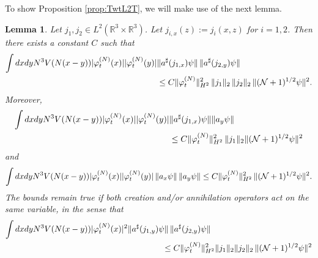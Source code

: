 \documentclass[11pt,a4paper]{article}
\newtheorem{lemma}[thm]{Lemma}
\newcommand{\bR}{{\mathbb R}}
\newcommand{\cN}{{\cal N}}
\begin{document}
To show Proposition \ref{prop:TwtL2T}, we will make use of the next lemma.
\begin{lemma}\label{lm:2b}
Let $j_1, j_2 \in L^2 (\bR^3 \times \bR^3)$. Let $j_{i,x} (z) := j_i (x,z)$ for $i=1,2$. Then there exists a constant $C$ such that 
\begin{equation}\label{eq:lm2b-1}  
\begin{split}
\int dx dy N^3 V(N (x-y)) |\varphi_t^{(N)} (x)| |\varphi_t^{(N)} (y)| & \| a^\sharp (j_{1,x}) \psi \| \, \| a^\sharp (j_{2,y}) \psi \| \\  &\leq C \| \varphi_t^{(N)} \|_{H^2}^2  \, \| j_1 \|_2 \, \| j_2 \|_2 \, \| (\cN+1)^{1/2} \psi \|^2. \end{split} \end{equation}
Moreover,  
\begin{equation}\label{eq:lm2b-2} 
\begin{split}
\int dx dy N^3 V(N (x-y)) |\varphi_t^{(N)} (x)| |\varphi_t^{(N)} (y)| &\| a^\sharp (j_{1,x}) \psi \|  \| a_y \psi \| \\&\leq C\| \varphi_t^{(N)} \|_{H^2}^2  \, \| j_1 \|_2 \| (\cN+1)^{1/2} \psi \|^2 \end{split} \end{equation}
and 
\begin{equation}\label{eq:lm2b-3}
\int dx dy N^3 V(N (x-y))   |\varphi_t^{(N)} (x)| |\varphi_t^{(N)} (y)|  \, \| a_x \psi \| \, \|  a_y  \psi \|  
\leq C \| \varphi_t^{(N)}\|_{H^2}^2  \,\| (\cN+1)^{1/2} \psi \|^2 .
\end{equation}
The bounds remain true if both creation and/or annihilation operators act on the same variable, in the sense that
\begin{equation}\label{eq:lm2b-4} \begin{split}
 \int dx dy N^3 V(N (x-y))&|\varphi_t^{(N)} (x)|^2 \| a^\sharp (j_{1,y})  \psi \| \, \|  a^\sharp (j_{2,y}) \psi \|  
 \\  &\hspace{3cm} \leq C\| \varphi_t^{(N)} \|_{H^2}^2 \|j_1 \|_2 \| j_2 \|_2 \, \| (\cN+1)^{1/2} \psi \|^2 \\

\end{split}
\end{equation}
\end{lemma}
\end{document}
